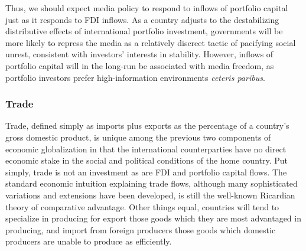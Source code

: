 \documentclass[12pt]{report}
\begin{document}
Thus, we should expect media policy to respond to inflows of portfolio
capital just as it responds to FDI inflows. As a country adjusts to
the destabilizing distributive effects of international portfolio
investment, governments will be more likely to repress the media as
a relatively discreet tactic of pacifying social unrest, consistent
with investors' interests in stability. However, inflows of portfolio
capital will in the long-run be associated with media freedom, as
portfolio investors prefer high-information environments \emph{ceteris
paribus}.

\subsubsection{Trade}

Trade, defined simply as imports plus exports as the percentage of
a country's gross domestic product, is unique among the previous two
components of economic globalization in that the international counterparties
have no direct economic stake in the social and political conditions
of the home country. Put simply, trade is not an investment as are
FDI and portfolio capital flows. The standard economic intuition explaining
trade flows, although many sophisticated variations and extensions
have been developed, is still the well-known Ricardian theory of comparative
advantage. Other things equal, countries will tend to specialize in
producing for export those goods which they are most advantaged in
producing, and import from foreign producers those goods which domestic
producers are unable to produce as efficiently.
\end{document}
